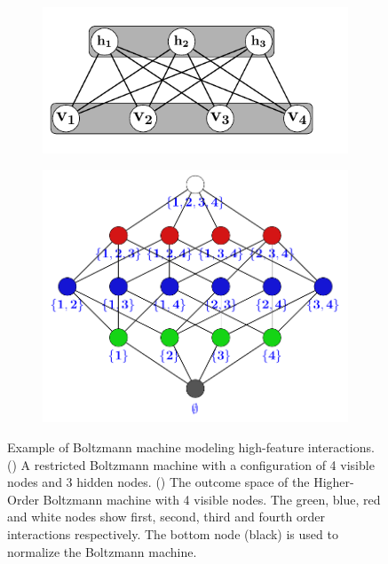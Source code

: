 \documentclass[letterpaper]{article} %
\begin{document}
	\begin{figure}[t]
		\centering
		\begin{subfigure}[b]{0.49\columnwidth}
			\centering
			\includegraphics[width=\textwidth]{./RBM.pdf}
			\caption{} \label{fig:RBM}
		\end{subfigure}
		\begin{subfigure}[b]{0.49\columnwidth}
			\centering
			\includegraphics[width=\textwidth]{./HBM.pdf}
			\caption{} \label{fig:HBM}
		\end{subfigure}
		\caption{Example of Boltzmann machine modeling high-feature interactions. () A restricted Boltzmann machine with a configuration of 4 visible nodes and 3 hidden nodes. () The outcome space of the Higher-Order Boltzmann machine with 4 visible nodes. The green, blue, red and white nodes show first, second, third and fourth order interactions respectively. The bottom node (black) is used to normalize the Boltzmann machine.}
	\end{figure}
\end{document}
